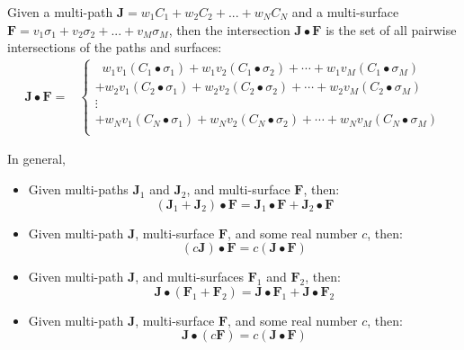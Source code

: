 \documentclass{book}
\begin{document}
Given a multi-path \(\mathbf{J} = w_1C_1 + w_2C_2 + ... + w_NC_N\) and a multi-surface \\ \(\mathbf{F} = v_1\sigma_1 + v_2\sigma_2 + ... + v_M\sigma_M\), then the intersection \(\mathbf{J} \bullet \mathbf{F}\) is the set of all pairwise intersections of the paths and surfaces:
\begin{align*}
\mathbf{J} \bullet \mathbf{F} = & \left\{\begin{array}{c}
\;\; w_1 v_1 (C_1 \bullet \sigma_1) + w_1 v_2 (C_1 \bullet \sigma_2) + \cdots + w_1 v_M (C_1 \bullet \sigma_M) \\ 
+ w_2 v_1 (C_2 \bullet \sigma_1) + w_2 v_2 (C_2 \bullet \sigma_2) + \cdots + w_2 v_M (C_2 \bullet \sigma_M) \\ 
\vdots \\
+ w_N v_1 (C_N \bullet \sigma_1) + w_N v_2 (C_N \bullet \sigma_2) + \cdots + w_N v_M (C_N \bullet \sigma_M) \\ 
\end{array}\right.
\end{align*}

In general,
\begin{itemize}
\item Given multi-paths \(\mathbf{J}_1\) and \(\mathbf{J}_2\), and multi-surface \(\mathbf{F}\), then:
\[(\mathbf{J}_1 + \mathbf{J}_2) \bullet \mathbf{F} = \mathbf{J}_1 \bullet \mathbf{F} + \mathbf{J}_2 \bullet \mathbf{F}\] 
\item Given multi-path \(\mathbf{J}\), multi-surface \(\mathbf{F}\), and some real number \(c\), then:
\[(c\mathbf{J}) \bullet \mathbf{F} = c(\mathbf{J} \bullet \mathbf{F})\]
\item Given multi-path \(\mathbf{J}\), and multi-surfaces \(\mathbf{F}_1\) and \(\mathbf{F}_2\), then:
\[\mathbf{J} \bullet (\mathbf{F}_1 + \mathbf{F}_2) = \mathbf{J} \bullet \mathbf{F}_1 + \mathbf{J} \bullet \mathbf{F}_2\] 
\item Given multi-path \(\mathbf{J}\), multi-surface \(\mathbf{F}\), and some real number \(c\), then:
\[\mathbf{J} \bullet (c\mathbf{F}) = c(\mathbf{J} \bullet \mathbf{F})\]
\end{itemize}
\end{document}
